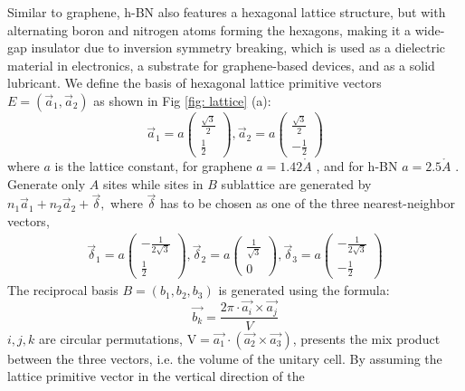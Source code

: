 Similar to graphene, \gls{h-BN} also features a hexagonal lattice structure, but with alternating boron and nitrogen atoms forming the hexagons, making it a wide-gap insulator due to inversion symmetry breaking, which is used as a dielectric material in electronics, a substrate for graphene-based devices, and as a solid lubricant.
We define the basis of hexagonal lattice primitive vectors $E = (\vec{a}_{1}, \vec{a}_{2})$ as shown in Fig \ref{fig: lattice} (a):
$$
	\vec{a}_{1}=a\left(\begin{array}{l}
			\frac{\sqrt{3}}{2} \\
			\frac{1}{2}
		\end{array}\right),
	\vec{a}_{2}=a\left(\begin{array}{l}
			\frac{\sqrt{3}}{2} \\
			-\frac{1}{2}
		\end{array}\right)
$$
where $a$ is the lattice constant, for graphene $a= 1.42 \mathring{A}$ \cite{sarma2011electronic}, and for \gls{h-BN} $a= 2.5 \mathring{A}$ \cite{PhysRevB.81.155433}. Generate only $A$ sites while sites in $B$ sublattice are generated by $n_{1} \vec{a}_{1}+n_{2} \vec{a}_{2}+\vec{\delta},$ where $\vec{\delta}$ has to be chosen as one of the three nearest-neighbor vectors,
$$
	\begin{array}{c}
		\vec{\delta}_{1}=a\left(\begin{array}{l}
				                        -\frac{1}{2 \sqrt{3}} \\ \frac{1}{2}\end{array}\right),
		\vec{\delta}_{2}=a\left(\begin{array}{l}\frac{1}{\sqrt{3}}\\ 0 \end{array}\right),
		\vec{\delta}_{3}=a\left(\begin{array}{l} -\frac{1}{2 \sqrt{3}}\\ -\frac{1}{2}\end{array}\right)
	\end{array}
$$
The reciprocal basis $B=\left(b_{1}, b_{2}, b_{3}\right)$ is generated using the formula:
$$
	\overrightarrow{b_{k}}=\frac{2 \pi \cdot \overrightarrow{a_{i}} \times \overrightarrow{a_{j}}}{V}
$$
$i, j, k$ are circular permutations, $\mathrm{V}=\overrightarrow{a_{1}}\cdot (\overrightarrow{a_{2}}
	\times \overrightarrow{a_3})$, presents the mix product between the three vectors, i.e. the volume
of the unitary cell.  By assuming the lattice primitive vector in the vertical direction of the
